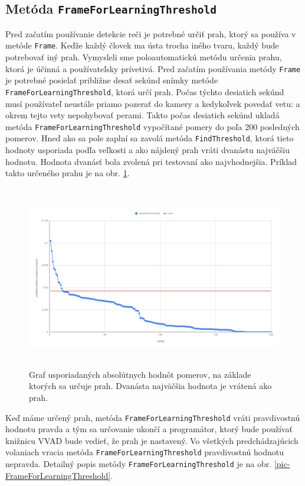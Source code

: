 \subsection{Metóda \texttt{FrameForLearningThreshold}}
Pred začatím používanie detekcie reči je potrebné určiť prah, ktorý sa používa v metóde  \texttt{Frame}. 
Keďže každý človek ma ústa trocha iného tvaru, každý bude potrebovať iný prah.
Vymysleli sme poloautomatickú metódu určenia prahu, ktorá je účinná a používateľsky prívetivá.
Pred začatím používania metódy \texttt{Frame} je potrebné posielať približne desať sekúnd snímky metóde  \texttt{FrameForLearningThreshold}, ktorá určí prah. 
Počas týchto desiatich sekúnd musí používateľ neustále priamo pozerať do kamery a kedykoľvek povedať vetu:  a okrem tejto vety nepohybovať perami.
Takto počas desiatich sekúnd ukladá metóda  \texttt{Frame\-For\-Learning\-Threshold} vypočítané pomery do poľa 200 posledných pomerov.
Hneď ako sa pole zaplní sa zavolá metóda \texttt{FindThreshold}, ktorá tieto hodnoty usporiada podľa veľkosti a ako nájdený prah vráti dvanástu najväčšiu hodnotu.
Hodnota dvanásť bola zvolená pri testovaní ako najvhodnejšia.
Príklad takto určeného prahu je na obr. \ref{pic-kalibraciaUsporiadane}.

\begin{figure}[H]
	\begin{center}
		\includegraphics[height=8cm]{pics/kalibraciaUsporiadane.png}
		\caption{Graf usporiadaných absolútnych hodnôt pomerov, na základe ktorých sa určuje prah. Dvanásta najväčšia hodnota je vrátená ako prah.}
		\label{pic-kalibraciaUsporiadane}
	\end{center}
\end{figure}

Keď máme určený prah, metóda \texttt{FrameForLearningThreshold} vráti pravdivostnú hodnotu pravda a tým sa určovanie ukončí a programátor, ktorý bude používať knižnicu VVAD bude vedieť, že prah je nastavený.
Vo všetkých predchádzajúcich volaniach vracia metóda \texttt{FrameForLearningThreshold} pravdivostnú hodnotu nepravda.
Detailný popis metódy \texttt{FrameForLearningThreshold} je na obr. \ref{pic-FrameForLearningThreshold}.

